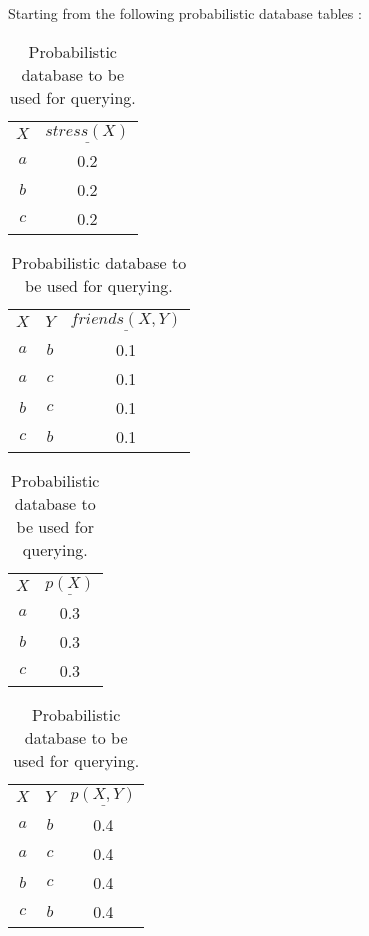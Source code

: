 


\noindent Starting from the following probabilistic database tables :

\begin{table}[h]

	\centering
	
	\begin{subtable}{.2\linewidth}{
	\centering
	\begin{tabular}{c|c}
		$X$ & $\underline{stress(X)}$\\
		$a$ & 0.2\\
		$b$ & 0.2\\
		$c$ & 0.2
	\end{tabular}}
	\label{tab:1a}
	\end{subtable}
	\begin{subtable}{.25\linewidth}{
	\centering
	\begin{tabular}{cc|c}
		$X$ & $Y$ & $\underline{friends(X,Y)}$\\
		$a$ & $b$ & 0.1\\
		$a$ & $c$ & 0.1\\
		$b$ & $c$ & 0.1\\
		$c$ & $b$ & 0.1\\
	\end{tabular}}
	\label{tab:2a}
	\end{subtable}
	\begin{subtable}{.2\linewidth}{
	\centering
	\begin{tabular}{c|c}
		$X$ & $\underline{p(X)}$\\
		$a$ & 0.3\\
		$b$ & 0.3\\
		$c$ & 0.3\\
	\end{tabular}}
	\label{tab:3a}
	\end{subtable}
	\begin{subtable}{.2\linewidth}{
	\centering
	\begin{tabular}{cc|c}
		$X$ & $Y$ & $\underline{p(X,Y)}$\\
		$a$ & $b$ & 0.4\\
		$a$ & $c$ & 0.4\\
		$b$ & $c$ & 0.4\\
		$c$ & $b$ & 0.4\\
	\end{tabular}}
	\label{tab:4a}
	\end{subtable}

	\caption{Probabilistic database to be used for querying.}\label{tab:probdata}

\end{table}

